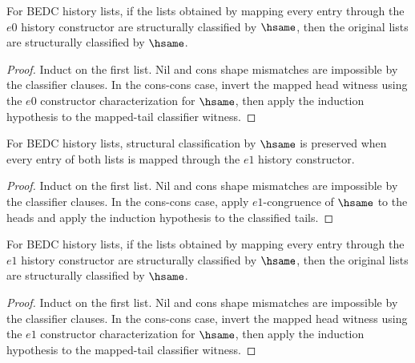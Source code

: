 \begin{theorem}
\label{thm:list-classifier-hsame-map-e0-inversion}
For BEDC history lists, if the lists obtained by mapping every entry through
the $e0$ history constructor are structurally classified by $\hsame$, then the
original lists are structurally classified by $\hsame$.
\end{theorem}
\begin{proof}
Induct on the first list. Nil and cons shape mismatches are impossible by the
classifier clauses. In the cons-cons case, invert the mapped head witness using
the $e0$ constructor characterization for $\hsame$, then apply the induction
hypothesis to the mapped-tail classifier witness.
\end{proof}

\begin{theorem}
\label{thm:list-classifier-hsame-map-e1}
For BEDC history lists, structural classification by $\hsame$ is preserved when every entry of both lists is mapped through the $e1$ history constructor.
\end{theorem}
\begin{proof}
Induct on the first list. Nil and cons shape mismatches are impossible by the classifier clauses. In the cons-cons case, apply $e1$-congruence of $\hsame$ to the heads and apply the induction hypothesis to the classified tails.
\end{proof}

\begin{theorem}
\label{thm:list-classifier-hsame-map-e1-inversion}
For BEDC history lists, if the lists obtained by mapping every entry through
the $e1$ history constructor are structurally classified by $\hsame$, then the
original lists are structurally classified by $\hsame$.
\end{theorem}
\begin{proof}
Induct on the first list. Nil and cons shape mismatches are impossible by the
classifier clauses. In the cons-cons case, invert the mapped head witness using
the $e1$ constructor characterization for $\hsame$, then apply the induction
hypothesis to the mapped-tail classifier witness.
\end{proof}

